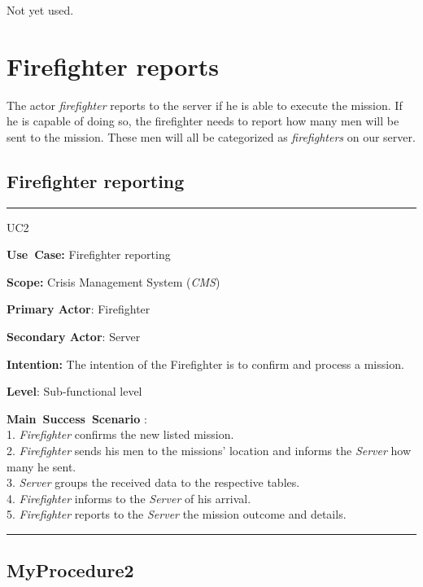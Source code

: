 Not yet used.

\section{Firefighter reports}

The actor \emph{firefighter} reports to the server if he is able to execute
the mission. If he is capable of doing so, the firefighter needs to report how
many men will be sent to the mission. These men will all be categorized as
\emph{firefighters} on our server.

\subsection{Firefighter reporting}

\vspace{0.5cm}
\hrule
\begin{lyxlist}{UC2}
\small{
\item [\textbf{Use~Case:}] Firefighter reporting
\item [\textbf{Scope:}] Crisis Management System (\emph{CMS})
\item [\textbf{Primary Actor}:] Firefighter
\item [\textbf{Secondary Actor}:] Server
\item [\textbf{Intention:}]The intention of the Firefighter is to confirm and
process a mission.
\item [\textbf{Level}:]Sub-functional level
\item [\textbf{Main~Success~Scenario}]:\\
1. \emph{Firefighter} confirms the new listed mission.\\
2. \emph{Firefighter} sends his men to the missions' location and informs the
\emph{Server} how many he sent.\\
3. \emph{Server} groups the received data to the respective tables.\\
4. \emph{Firefighter} informs to the \emph{Server} of his arrival.\\
5. \emph{Firefighter} reports to the \emph{Server} the mission outcome and
details.

}

\end{lyxlist}
\hrule
\vspace{0.5cm}

\subsection{MyProcedure2}




